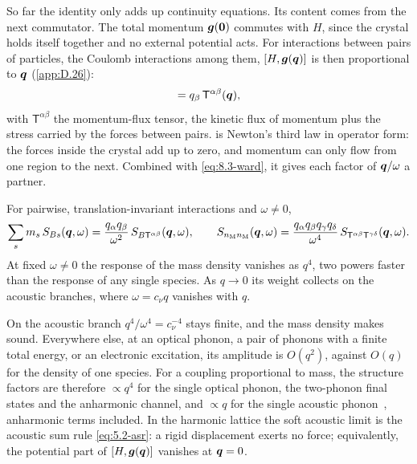 So far the identity only adds up continuity equations. Its content comes from the next commutator. The total momentum $\bm{g}(\bm{0})$ commutes with $H$, since the crystal holds itself together and no external potential acts. For interactions between pairs of particles, the Coulomb interactions among them, $[H, \bm{g}(\bm{q})]$ is then proportional to $\bm{q}$ (\cref{app:D.26}):
\begin{equation}
  [H, g^\alpha(\vect{q})] = q_\beta\,\mathsf{T}^{\alpha\beta}(\vect{q}) ,
  \label{eq:8.3-flux}
\end{equation}
with $\mathsf{T}^{\alpha\beta}$ the momentum-flux tensor, the kinetic flux of momentum plus the stress carried by the forces between pairs.  is Newton's third law in operator form: the forces inside the crystal add up to zero, and momentum can only flow from one region to the next. Combined with \cref{eq:8.3-ward}, it gives each factor of $\bm{q}/\omega$ a partner.
\begin{keyresult}
For pairwise, translation-invariant interactions and $\omega \neq 0$,
\begin{equation}
  \sum_sm_s\,S_{Bs}(\bm{q},\omega) = \frac{q_\alpha q_\beta}{\omega^2}\,S_{B\mathsf{T}^{\alpha\beta}}(\bm{q},\omega) , \qquad
  S_{n_{\mathrm{M}}n_{\mathrm{M}}}(\bm{q},\omega) = \frac{q_\alpha q_\beta q_\gamma q_\delta}{\omega^4}\,S_{\mathsf{T}^{\alpha\beta}\mathsf{T}^{\gamma\delta}}(\bm{q},\omega) .
  \label{eq:8.3-soft}
\end{equation}
At fixed $\omega \neq 0$ the response of the mass density vanishes as $q^4$, two powers faster than the response of any single species. As $q \to 0$ its weight collects on the acoustic branches, where $\omega = c_\nu q$ vanishes with $q$.
\end{keyresult}
\noindent On the acoustic branch $q^4/\omega^4 = c_\nu^{-4}$ stays finite, and the mass density makes sound. Everywhere else, at an optical phonon, a pair of phonons with a finite total energy, or an electronic excitation, its amplitude is $O(q^2)$, against $O(q)$ for the density of one species. For a coupling proportional to mass, the structure factors are therefore $\propto q^4$ for the single optical phonon, the two-phonon final states and the anharmonic channel, and $\propto q$ for the single acoustic phonon~\cite[Table~I and Sect.~V\,B]{campbelldeem2020multiphonon}, anharmonic terms included. In the harmonic lattice the soft acoustic limit is the acoustic sum rule \cref{eq:5.2-asr}: a rigid displacement exerts no force; equivalently, the potential part of $[H, \bm{g}(\bm{q})]$ vanishes at $\bm{q} = 0$.

